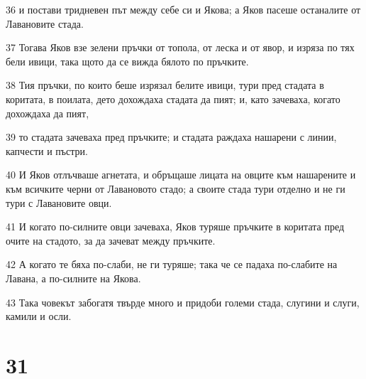 \par 36 и постави тридневен път между себе си и Якова; а Яков пасеше останалите от Лавановите стада.
\par 37 Тогава Яков взе зелени пръчки от топола, от леска и от явор, и изряза по тях бели ивици, така щото да се вижда бялото по пръчките.
\par 38 Тия пръчки, по които беше изрязал белите ивици, тури пред стадата в коритата, в поилата, дето дохождаха стадата да пият; и, като зачеваха, когато дохождаха да пият,
\par 39 то стадата зачеваха пред пръчките; и стадата раждаха нашарени с линии, капчести и пъстри.
\par 40 И Яков отлъчваше агнетата, и обръщаше лицата на овците към нашарените и към всичките черни от Лавановото стадо; а своите стада тури отделно и не ги тури с Лавановите овци.
\par 41 И когато по-силните овци зачеваха, Яков туряше пръчките в коритата пред очите на стадото, за да зачеват между пръчките.
\par 42 А когато те бяха по-слаби, не ги туряше; така че се падаха по-слабите на Лавана, а по-силните на Якова.
\par 43 Така човекът забогатя твърде много и придоби големи стада, слугини и слуги, камили и осли.

\chapter{31}

